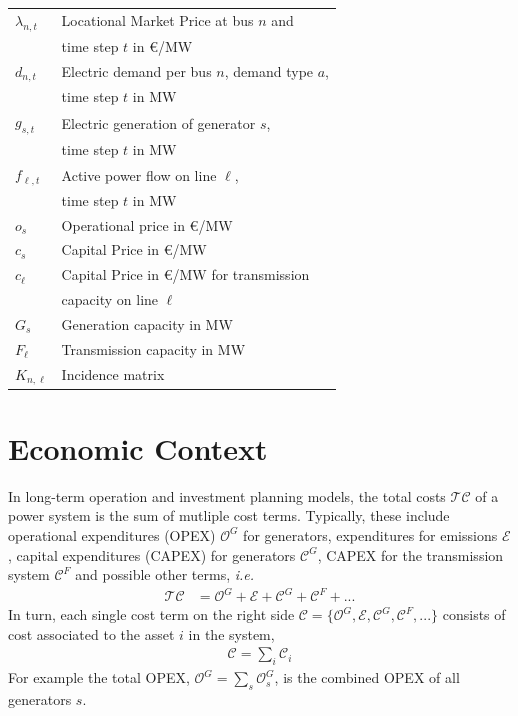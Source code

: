 \documentclass[11pt,twocolumn]{article}
\newcommand{\ie}{\textit{i.e.} }
\newcommand{\vpad}{\vspace{1mm}}
\newcommand{\generation}{g_{s,t}}
\newcommand{\capacitygeneration}{G_{s}}
\newcommand{\operationalpricegeneration}{o_{s}}
\newcommand{\capitalpricegeneration}{c_{s}}
\newcommand{\flow}{f_{\ell,t}}
\newcommand{\capacityflow}{F_{\ell}}
\newcommand{\capitalpriceflow}{c_{\ell}}
\newcommand{\lmp}[1][n]{\lambda_{#1,t}}
\newcommand{\demand}[1][n]{d_{#1,t}}
\newcommand{\incidence}[1][n]{K_{#1,\ell}}
\newcommand{\totalcost}{\mathcal{TC}}
\newcommand{\cost}{\mathcal{C}}
\newcommand{\opexgeneration}{\mathcal{O}^G}
\newcommand{\capexgeneration}{\mathcal{C}^G}
\newcommand{\capexflow}{\mathcal{C}^F}
\newcommand{\emissioncost}{\mathcal{E}}
\begin{document}
\begin{table}[h]
    \centering
    \begin{tabular}{ll}
        $\lmp$ & Locational Market Price at bus $n$ and  \\ & time step $t$ in \euro/MW \vpad \\
        $\demand$ & Electric demand per bus $n$, demand type $a$, \\ & time step $t$ in MW  \vpad \\
        $\generation$ & Electric generation of generator $s$, \\ & time step $t$  in MW \vpad \\
        $\flow$ & Active power flow on line $\ell$, \\ & time step $t$ in MW   \vpad \\
        $\operationalpricegeneration$ & Operational price in \euro/MW \vpad \\
        $\capitalpricegeneration$ & Capital Price in \euro/MW \vpad \\
        $\capitalpriceflow$  & Capital Price in \euro/MW for transmission \\ & capacity on line $\ell$  \vpad \\
        $\capacitygeneration$ & Generation capacity in MW \vpad \\
        $\capacityflow$ & Transmission capacity in MW \vpad \\
        $\incidence$ & Incidence matrix \vpad 
    \end{tabular}
\end{table}

\section{Economic Context}

In long-term operation and investment planning models, the total costs $\totalcost$ of a power system is the sum of mutliple cost terms. Typically, these include operational expenditures (OPEX) $\opexgeneration$ for generators, expenditures for emissions $\emissioncost$, capital expenditures (CAPEX) for generators $\capexgeneration$, CAPEX for the transmission system $\capexflow$ and possible other terms, \ie
\begin{align}
\totalcost &= \opexgeneration + \emissioncost +  \capexgeneration +  \capexflow + ...
\label{eq:total_cost}
\end{align}
In turn, each single cost term on the right side $\mathcal{C} = \{\opexgeneration, \emissioncost, \capexgeneration, \capexflow, ...\}$ consists of cost associated to the asset $i$ in the system, 
\begin{align}
    \cost = \sum_{i} \cost_{i}
    \label{eq:asset_cost}
\end{align} 
For example the total OPEX, $\opexgeneration = \sum_{s} \opexgeneration_{s}$, is the combined OPEX of all generators $s$.
\end{document}
